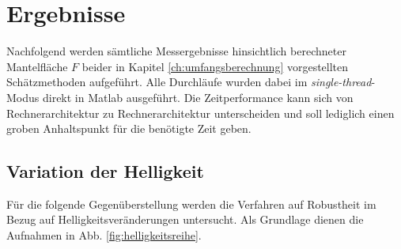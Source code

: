 \documentclass[accentcolor=tud1c, 11pt, toc=bib, toc=listof, captions=abovetable, parskip=half]{tudreport}
\begin{document}
\section{Ergebnisse}
Nachfolgend werden sämtliche Messergebnisse hinsichtlich berechneter Mantelfläche $F$ beider in Kapitel \ref{ch:umfangsberechnung} vorgestellten Schätzmethoden aufgeführt. Alle Durchläufe wurden dabei im \textit{single-thread}-Modus direkt in Matlab ausgeführt. Die Zeitperformance kann sich von Rechnerarchitektur zu Rechnerarchitektur unterscheiden und soll lediglich einen groben Anhaltspunkt für die benötigte Zeit geben.

\subsection{Variation der Helligkeit}
Für die folgende Gegenüberstellung werden die Verfahren auf Robustheit im Bezug auf Helligkeitsveränderungen untersucht. Als Grundlage dienen die Aufnahmen in Abb. \ref{fig:helligkeitsreihe}.\\
\end{document}
